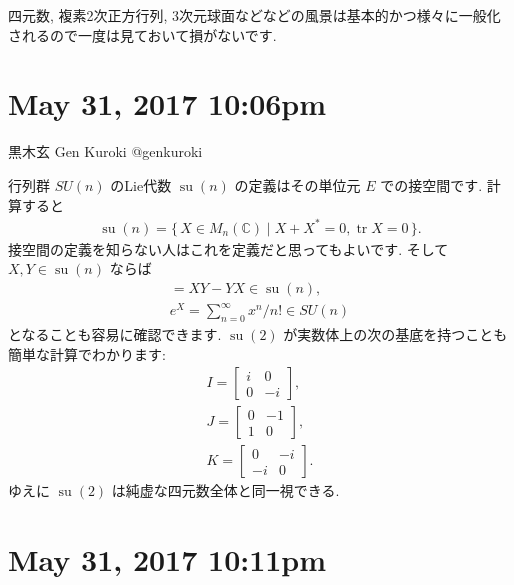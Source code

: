 \documentclass[12pt,twoside]{jarticle}
\newcommand\su{\operatorname{su}}
\theoremstyle{jplain}
\theoremstyle{jplain}
\theoremstyle{jplain}
\numberwithin{theorem}{section}
\numberwithin{equation}{section}
\numberwithin{figure}{section}
\numberwithin{table}{section}
\begin{document}
四元数, 複素2次正方行列, 3次元球面などなどの風景は基本的かつ様々に一般化されるので一度は見ておいて損がないです. 







\section{ May 31, 2017 10:06pm}








黒木玄 Gen Kuroki
@genkuroki


行列群 $SU(n)$ のLie代数 $\su(n)$ の定義はその単位元 $E$ での接空間です. 計算すると\begin{align*}\su(n)=\{\,X\in M_n(\mathbb C)\mid X+X^*=0, \operatorname{tr}X=0\,\}.\end{align*}接空間の定義を知らない人はこれを定義だと思ってもよいです. そして $X,Y\in\su(n)$ ならば\begin{align*}[X,Y]=XY-YX\in\su(n),\\ e^X=\sum_{n=0}^\infty x^n/n!\in SU(n)\end{align*}となることも容易に確認できます. $\su(2)$ が実数体上の次の基底を持つことも簡単な計算でわかります:\begin{align*}I=\begin{bmatrix}i&0\\ 0&-i\end{bmatrix},\\ J=\begin{bmatrix}0&-1\\ 1&0\end{bmatrix},\\ K=\begin{bmatrix}0&-i\\ -i&0\end{bmatrix}.\end{align*}ゆえに $\su(2)$ は純虚な四元数全体と同一視できる. 







\section{ May 31, 2017 10:11pm}
\end{document}
